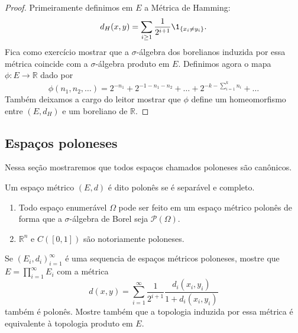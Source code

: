 \begin{proof}
  Primeiramente definimos em $E$ a Métrica de Hamming:
  \begin{equation}
    \label{e:hamming_distance}
    d_H(x,y) = \sum_{i \geq 1} \frac{1}{2^{i + 1}} \1_{\{x_i \neq y_i\}}.
  \end{equation}
  Fica como exercício mostrar que a $\sigma$-álgebra dos borelianos induzida por essa métrica coincide com a $\sigma$-álgebra produto em $E$.
  Definimos agora o mapa $\phi:E \to \mathbb{R}$ dado por
  \begin{equation}
    \phi(n_1, n_2, \dots) = 2^{-n_1} + 2^{-1 - n_1 - n_2} + \dots + 2^{-k - \sum_{i=1}^k n_i} + \dots
  \end{equation}
  Também deixamos a cargo do leitor mostrar que $\phi$ define um homeomorfismo entre $(E,d_H)$ e um boreliano de $\mathbb{R}$.
\end{proof}

\subsection{Espaços poloneses}

Nessa seção mostraremos que todos espaços chamados poloneses são canônicos.

\begin{definition}
  Um espaço métrico $(E,d)$ é dito polonês  se é separável e completo.
\end{definition}

\begin{example} \mbox{}
  \begin{enumerate}[\quad a)]
  \item Todo espaço enumerável $\Omega$ pode ser feito em um espaço métrico polonês de forma que a $\sigma$-álgebra de Borel seja $\mathcal{P}(\Omega)$.
  \item $\mathbb{R}^n$ e $C([0,1])$ são notoriamente poloneses.
  \end{enumerate}
\end{example}

\begin{exercise}
  Se $(E_i, d_i)_{i=1}^\infty$ é uma sequencia de espaços métricos poloneses, mostre que $E = \prod_{i=1}^{\infty} E_i$ com a métrica
  \begin{equation}
    \label{e:metrica_produto}
    d(x,y) = \sum_{i=1}^{\infty} \frac{1}{2^{i+1}} \frac{d_i(x_i, y_i)}{1 + d_i(x_i, y_i)}
  \end{equation}
  também é polonês.
  Mostre também que a topologia induzida por essa métrica é equivalente à topologia produto em $E$.
\end{exercise}

